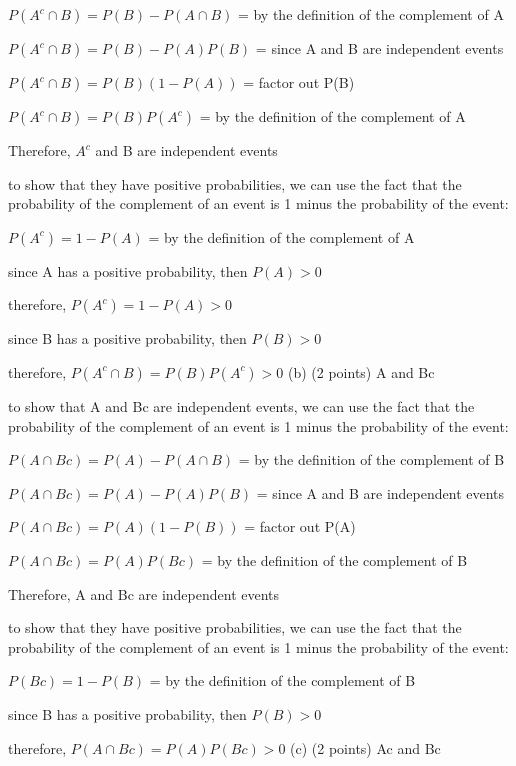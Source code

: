 \documentclass{article}
\begin{document}
\(P(A^c \cap B) = P(B) - P(A \cap B)\) = by the definition of the complement of A

\(P(A^c \cap B) = P(B) - P(A)P(B)\) = since A and B are independent events

\(P(A^c \cap B) = P(B)(1 - P(A))\) = factor out P(B)

\(P(A^c \cap B) = P(B)P(A^c)\) = by the definition of the complement of A

Therefore, \(A^c\) and B are independent events\newline

to show that they have positive probabilities, we can use the fact that the probability of the complement of an event is 1 minus the probability of the event:

\(P(A^c) = 1 - P(A)\) = by the definition of the complement of A

since A has a positive probability, then \(P(A) > 0\)

therefore, \(P(A^c) = 1 - P(A) > 0\)

since B has a positive probability, then \(P(B) > 0\)

therefore, \(P(A^c \cap B) = P(B)P(A^c) > 0\)   \newline
(b) (2 points) A and Bc

to show that A and Bc are independent events, we can use the fact that the probability of the complement of an event is 1 minus the probability of the event:

\(P(A \cap Bc) = P(A) - P(A \cap B)\) = by the definition of the complement of B

\(P(A \cap Bc) = P(A) - P(A)P(B)\) = since A and B are independent events

\(P(A \cap Bc) = P(A)(1 - P(B))\) = factor out P(A)

\(P(A \cap Bc) = P(A)P(Bc)\) = by the definition of the complement of B

Therefore, A and Bc are independent events\newline

to show that they have positive probabilities, we can use the fact that the probability of the complement of an event is 1 minus the probability of the event:

\(P(Bc) = 1 - P(B)\) = by the definition of the complement of B

since B has a positive probability, then \(P(B) > 0\)

therefore, \(P(A \cap Bc) = P(A)P(Bc) > 0\)   \newline
(c) (2 points) Ac and Bc\newline
\end{document}
